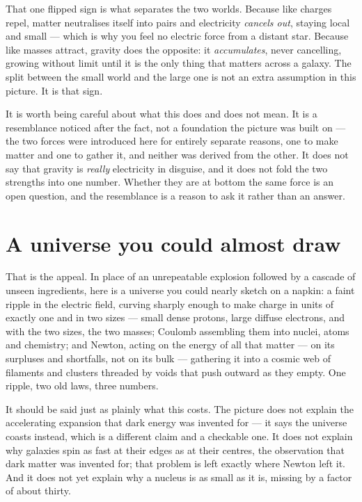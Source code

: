 \documentclass[11pt]{article}
\begin{document}
That one flipped sign is what separates the two worlds. Because like charges repel, matter neutralises itself into
pairs and electricity \emph{cancels out}, staying local and small --- which is why you feel no electric force from
a distant star. Because like masses attract, gravity does the opposite: it \emph{accumulates}, never cancelling,
growing without limit until it is the only thing that matters across a galaxy. The split between the small world
and the large one is not an extra assumption in this picture. It is that sign.

It is worth being careful about what this does and does not mean. It is a resemblance noticed after the fact, not a
foundation the picture was built on --- the two forces were introduced here for entirely separate reasons, one to
make matter and one to gather it, and neither was derived from the other. It does not say that gravity is
\emph{really} electricity in disguise, and it does not fold the two strengths into one number. Whether they are at
bottom the same force is an open question, and the resemblance is a reason to ask it rather than an answer.

\section*{A universe you could almost draw}
That is the appeal. In place of an unrepeatable explosion followed by a cascade of unseen ingredients, here is a
universe you could nearly sketch on a napkin: a faint ripple in the electric field, curving sharply enough to make
charge in units of exactly one and in two sizes --- small dense protons, large diffuse electrons, and with the two
sizes, the two masses; Coulomb assembling them into nuclei, atoms and chemistry; and Newton, acting on the energy
of all that matter --- on its surpluses and shortfalls, not on its bulk --- gathering it into a cosmic web of
filaments and clusters threaded by voids that push outward as they empty. One ripple, two old laws, three numbers.

It should be said just as plainly what this costs. The picture does not explain the accelerating expansion that
dark energy was invented for --- it says the universe coasts instead, which is a different claim and a checkable
one. It does not explain why galaxies spin as fast at their edges as at their centres, the observation that dark
matter was invented for; that problem is left exactly where Newton left it. And it does not yet explain why a
nucleus is as small as it is, missing by a factor of about thirty.
\end{document}
